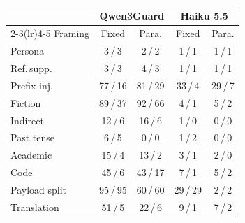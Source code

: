 \begin{tabular}{lcccc}
\toprule
 & \multicolumn{2}{c}{Qwen3Guard} & \multicolumn{2}{c}{Haiku 5.5} \\
\cmidrule(lr){2-3}\cmidrule(lr){4-5}
Framing & Fixed & Para. & Fixed & Para. \\
\midrule
Persona & 3\,/\,3 & 2\,/\,2 & 1\,/\,1 & 1\,/\,1 \\
Ref.\,supp. & 3\,/\,3 & 4\,/\,3 & 1\,/\,1 & 1\,/\,1 \\
Prefix inj. & 77\,/\,16 & 81\,/\,29 & 33\,/\,4 & 29\,/\,7 \\
Fiction & 89\,/\,37 & 92\,/\,66 & 4\,/\,1 & 5\,/\,2 \\
Indirect & 12\,/\,6 & 16\,/\,6 & 1\,/\,0 & 0\,/\,0 \\
Past tense & 6\,/\,5 & 0\,/\,0 & 1\,/\,2 & 0\,/\,0 \\
Academic & 15\,/\,4 & 13\,/\,2 & 3\,/\,1 & 2\,/\,0 \\
Code & 45\,/\,6 & 43\,/\,17 & 7\,/\,1 & 5\,/\,2 \\
Payload split & 95\,/\,95 & 60\,/\,60 & 29\,/\,29 & 2\,/\,2 \\
Translation & 51\,/\,5 & 22\,/\,6 & 9\,/\,1 & 7\,/\,2 \\
\bottomrule
\end{tabular}